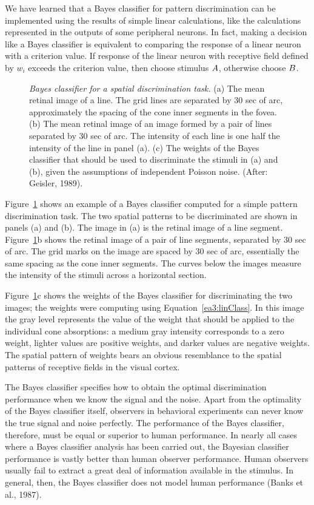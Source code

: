 We have learned that a Bayes classifier for pattern discrimination can
be implemented using the results of simple linear calculations, like
the calculations represented in the outputs of some peripheral
neurons.  In fact, making a decision like a Bayes classifier is
equivalent to comparing the response of a linear neuron with a
criterion value.  If response of the linear neuron with receptive
field defined by $w_i$ exceeds the criterion value, then choose
stimulus $\mbox{$A$}$, otherwise choose $\mbox{$B$}$.

\begin{figure}
\centerline{
  }
\caption[Geisler Bayesian classifier]{
{\em Bayes classifier for a spatial discrimination task.}  (a) The
mean retinal image of a line.  The grid lines are separated by 30 sec
of arc, approximately the spacing of the cone inner segments in the
fovea.  (b) The mean retinal image of an image formed by a pair of
lines separated by 30 sec of arc.  The intensity of each line is one
half the intensity of the line in panel (a).  (c) The weights of the
Bayes classifier that should be used to discriminate the stimuli in
(a) and (b), given the assumptions of independent Poisson noise.
(After: Geisler, 1989).  }
\label{fa3:geisler}
\end{figure}
Figure~\ref{fa3:geisler} shows an example of a Bayes classifier
computed for a simple pattern discrimination task.  The two spatial
patterns to be discriminated are shown in panels (a) and (b).  The
image in (a) is the retinal image of a line segment.
Figure~\ref{fa3:geisler}b shows the retinal image of a pair of line
segments, separated by 30 sec of arc.  The grid marks on the image are
spaced by 30 sec of arc, essentially the same spacing as the cone
inner segments. The curves below the images measure the intensity of
the stimuli across a horizontal section.

Figure~\ref{fa3:geisler}c shows the weights of the Bayes classifier
for discriminating the two images; the weights were computing using
Equation~\ref{ea3:linClass}.  In this image the gray level represents
the value of the weight that should be applied to the individual cone
absorptions: a medium gray intensity corresponds to a zero weight,
lighter values are positive weights, and darker values are negative
weights.  The spatial pattern of weights bears an obvious resemblance
to the spatial patterns of receptive fields in the visual cortex.

The Bayes classifier specifies how to obtain the optimal
discrimination performance when we know the signal and the noise.
Apart from the optimality of the Bayes classifier itself, observers in
behavioral experiments can never know the true signal and noise
perfectly.  The performance of the Bayes classifier, therefore, must
be equal or superior to human performance.  In nearly all cases where
a Bayes classifier analysis has been carried out, the Bayesian
classifier performance is vastly better than human observer
performance.  Human observers usually fail to extract a great deal of
information available in the stimulus.  In general, then, the Bayes
classifier does not model human performance (Banks et al., 1987).


